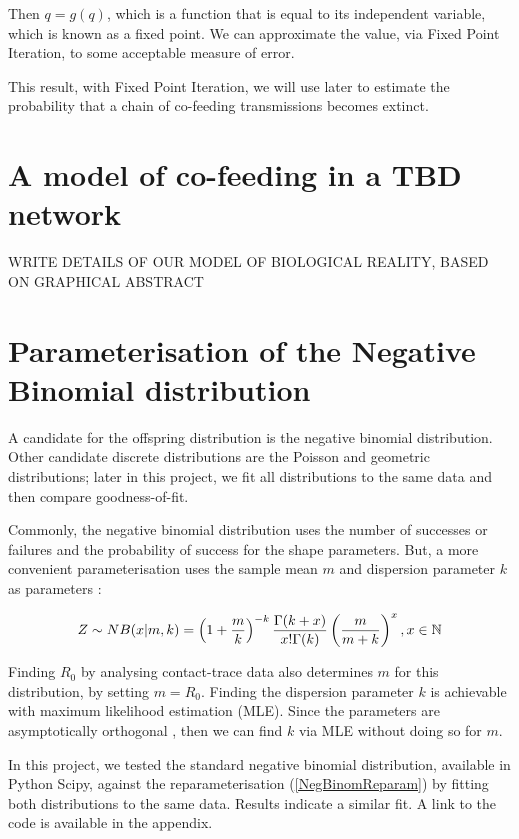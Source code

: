 \documentclass{article}
\begin{document}
Then $q = g(q) $, which is a function that is equal to its independent variable, which is known as a fixed point. We can approximate the value, via Fixed Point Iteration, to some acceptable measure of error.

This result, with Fixed Point Iteration, we will use later to estimate the probability that a chain of co-feeding transmissions becomes extinct.

\section{A model of co-feeding in a TBD network}

WRITE DETAILS OF OUR MODEL OF BIOLOGICAL REALITY, BASED ON GRAPHICAL ABSTRACT

\section{Parameterisation of the Negative Binomial distribution}

A candidate for the offspring distribution is the negative binomial distribution. Other candidate discrete distributions are the Poisson and geometric distributions; later in this project, we fit all distributions to the same data and then compare goodness-of-fit. 

Commonly, the negative binomial distribution uses the number of successes or failures and the probability of success for the shape parameters. But, a more convenient parameterisation uses the sample mean $ m $ and dispersion parameter $ k $ as parameters \cite{Rice2007}:

\begin{equation}\label{NegBinomReparam}
    Z \sim NB(x | m, k) = \left(1+\frac{m}{k}\right)^{-k} \space \frac{\Gamma(k+x)}{x!\Gamma(k)} \space \left(\frac{m}{m+k}\right)^x, \space \space \space \space \space x \in \mathbb{N}
\end{equation}

Finding $ R_0 $ by analysing contact-trace data also determines $ m $ for this distribution, by setting $ m=R_0 $. Finding the dispersion parameter $ k $ is achievable with maximum likelihood estimation (MLE). Since the parameters are asymptotically orthogonal \cite{LloydSmith2005}, then we can find $ k $ via MLE without doing so for $ m $.

In this project, we tested the standard negative binomial distribution, available in Python Scipy, against the reparameterisation (\ref{NegBinomReparam}) by fitting both distributions to the same data. Results indicate a similar fit. A link to the code is available in the appendix.
\end{document}
